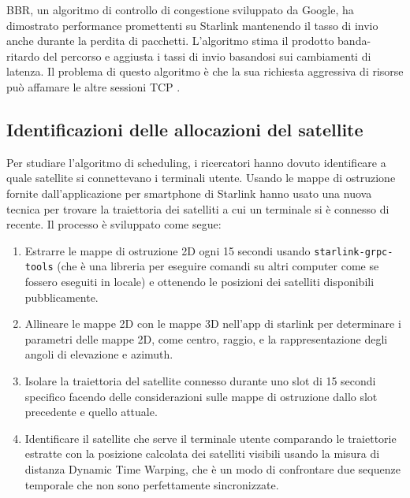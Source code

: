 BBR, un algoritmo di controllo di congestione sviluppato da Google, ha dimostrato performance promettenti su Starlink mantenendo il tasso di invio anche durante la perdita di pacchetti.
L'algoritmo stima il prodotto banda-ritardo del percorso e aggiusta i tassi di invio basandosi sui cambiamenti di latenza.
Il problema di questo algoritmo è che la sua richiesta aggressiva di risorse può affamare le altre sessioni TCP \cite{geoff_huston_transport_2024}.

\subsection{Identificazioni delle allocazioni del satellite}
Per studiare l'algoritmo di scheduling, i ricercatori hanno dovuto identificare a quale satellite si connettevano i terminali utente.
Usando le mappe di ostruzione fornite dall'applicazione per smartphone di Starlink hanno usato una nuova tecnica per trovare la traiettoria dei satelliti a cui un terminale si è connesso di recente.
Il processo è sviluppato come segue:
\begin{enumerate}
  \item Estrarre le mappe di ostruzione 2D ogni 15 secondi usando \verb|starlink-grpc-tools| (che è una libreria per eseguire comandi su altri computer come se fossero eseguiti in locale) e ottenendo le posizioni dei satelliti disponibili pubblicamente.
  \item Allineare le mappe 2D con le mappe 3D nell'app di starlink per determinare i parametri delle mappe 2D, come centro, raggio, e la rappresentazione degli angoli di elevazione e azimuth.
  \item Isolare la traiettoria del satellite connesso durante uno slot di 15 secondi specifico facendo delle considerazioni sulle mappe di ostruzione dallo slot precedente e quello attuale.
  \item Identificare il satellite che serve il terminale utente comparando le traiettorie estratte con la posizione calcolata dei satelliti visibili usando la misura di distanza Dynamic Time Warping, che è un modo di confrontare due sequenze temporale che non sono perfettamente sincronizzate.
\end{enumerate}

